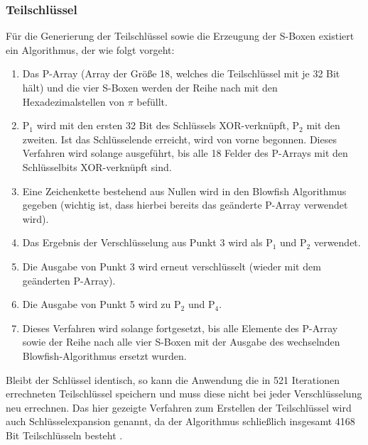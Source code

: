 \documentclass[10pt, a4paper,headsepline]{scrreprt}
\begin{document}
\subsubsection{Teilschlüssel}
Für die Generierung der Teilschlüssel sowie die Erzeugung der S-Boxen existiert ein Algorithmus, der wie folgt vorgeht:
\begin{enumerate}
\item Das P-Array (Array der Größe 18, welches die Teilschlüssel mit je 32 Bit hält) und die vier S-Boxen werden der Reihe nach mit den Hexadezimalstellen von $\pi$ befüllt.
\item P$_{1}$ wird mit den ersten 32 Bit des Schlüssels XOR-verknüpft, P$_{2}$ mit den zweiten. Ist das Schlüsselende erreicht, wird von vorne begonnen. Dieses Verfahren wird solange ausgeführt, bis alle 18 Felder des P-Arrays mit den Schlüsselbits XOR-verknüpft sind.
\item Eine Zeichenkette bestehend aus Nullen wird in den Blowfish Algorithmus gegeben (wichtig ist, dass hierbei bereits das geänderte P-Array verwendet wird).
\item Das Ergebnis der Verschlüsselung aus Punkt 3 wird als P$_{1}$ und P$_{2}$ verwendet.
\item Die Ausgabe von Punkt 3 wird erneut verschlüsselt (wieder mit dem geänderten P-Array).
\item Die Ausgabe von Punkt 5 wird zu P$_{2}$ und P$_{4}$.
\item Dieses Verfahren wird solange fortgesetzt, bis alle Elemente des P-Array sowie der Reihe nach alle vier S-Boxen mit der Ausgabe des wechselnden Blowfish-Algorithmus ersetzt wurden.
\end{enumerate}
Bleibt der Schlüssel identisch, so kann die Anwendung die in 521 Iterationen errechneten Teilschlüssel speichern und muss diese nicht bei jeder Verschlüsselung neu errechnen.
Das hier gezeigte Verfahren zum Erstellen der Teilschlüssel wird auch Schlüsselexpansion genannt, da der Algorithmus schließlich insgesamt 4168 Bit Teilschlüsseln besteht \citep[S. 390f]{book:angewandte-krypto}.
 
\end{document}
